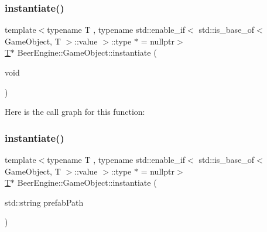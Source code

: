 \mbox{\label{class_beer_engine_1_1_game_object_ab88b7ff5e8aab52e54c02f9d103bbfcf}} 
\subsubsection{\texorpdfstring{instantiate()}{instantiate()}\hspace{0.1cm}{\footnotesize\ttfamily [1/2]}}
{\footnotesize\ttfamily template$<$typename T , typename std\+::enable\+\_\+if$<$ std\+::is\+\_\+base\+\_\+of$<$ Game\+Object, T $>$\+::value $>$\+::type $\ast$  = nullptr$>$ \\
\mbox{\hyperlink{namespace_beer_engine_a94f0b552f6dc910de8cdb44207981f53a8de48e594408f9fc561b2f68ce05f664}{T}}$\ast$ Beer\+Engine\+::\+Game\+Object\+::instantiate (\begin{DoxyParamCaption}\item[{void}]{ }\end{DoxyParamCaption})\hspace{0.3cm}{\ttfamily [inline]}}

Here is the call graph for this function\+:
\mbox{\label{class_beer_engine_1_1_game_object_ad523cd5783c0bfda02a9077af646e25b}} 
\subsubsection{\texorpdfstring{instantiate()}{instantiate()}\hspace{0.1cm}{\footnotesize\ttfamily [2/2]}}
{\footnotesize\ttfamily template$<$typename T , typename std\+::enable\+\_\+if$<$ std\+::is\+\_\+base\+\_\+of$<$ Game\+Object, T $>$\+::value $>$\+::type $\ast$  = nullptr$>$ \\
\mbox{\hyperlink{namespace_beer_engine_a94f0b552f6dc910de8cdb44207981f53a8de48e594408f9fc561b2f68ce05f664}{T}}$\ast$ Beer\+Engine\+::\+Game\+Object\+::instantiate (\begin{DoxyParamCaption}\item[{std\+::string}]{prefab\+Path }\end{DoxyParamCaption})\hspace{0.3cm}{\ttfamily [inline]}}

